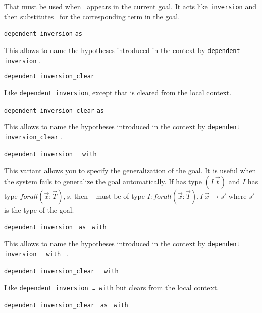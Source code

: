 \begin{Variants}
  That must be used when \ident\ appears in the current goal.  It acts
  like \texttt{inversion} and then substitutes \ident\ for the
  corresponding term in the goal.
  
\item {} \texttt{dependent
    inversion} {\ident} \texttt{as} {\intropattern} 
  
  This allows to name the hypotheses introduced in the context by
  \texttt{dependent inversion} {\ident}.

\item {} \texttt{dependent
    inversion\_clear} {\ident} 
  
  Like \texttt{dependent inversion}, except that {\ident} is cleared
  from the local context.

\item {}
  \texttt{dependent inversion\_clear} {\ident}\texttt{as} {\intropattern}
  
  This allows to name the hypotheses introduced in the context by
  \texttt{dependent inversion\_clear} {\ident}.

\item {} \texttt{dependent
    inversion } {\ident} \texttt{ with } \term  
  
  This variant allows you to specify the generalization of the goal. It
  is useful when the system fails to generalize the goal automatically. If
  {\ident} has type $(I~\vec{t})$ and $I$ has type
  $forall (\vec{x}:\vec{T}), s$,   then \term~  must be of type
  $I:forall (\vec{x}:\vec{T}), I~\vec{x}\to s'$ where $s'$ is the
  type of the goal.

\item {}
  \texttt{dependent inversion } {\ident} \texttt{as} {\intropattern}
  \texttt{ with } \term  
  
  This allows to name the hypotheses introduced in the context by
  \texttt{dependent inversion } {\ident} \texttt{ with } \term.

\item {}
  \texttt{dependent inversion\_clear } {\ident} \texttt{ with } \term 
  
  Like \texttt{dependent inversion \dots\ with} but clears {\ident} from
  the local context.

\item {}
  \texttt{dependent inversion\_clear } {\ident} \texttt{as}
  {\intropattern} \texttt{ with } \term 
  

\end{Variants}
